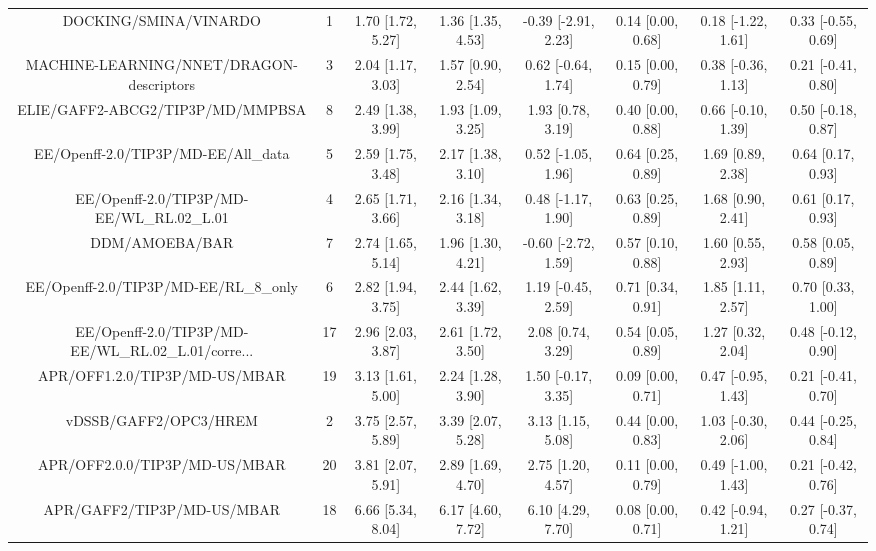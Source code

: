 \documentclass[8pt]{article}
\begin{document}
\begin{center}
\begin{footnotesize}
\begin{longtable}{|cccccccc|}
\bottomrule
\endlastfoot
                             DOCKING/SMINA/VINARDO &   1 & 1.70 [1.72, 5.27] & 1.36 [1.35, 4.53] & -0.39 [-2.91, 2.23] & 0.14 [0.00, 0.68] & 0.18 [-1.22, 1.61] & 0.33 [-0.55, 0.69] \\
          MACHINE-LEARNING/NNET/DRAGON-descriptors &   3 & 2.04 [1.17, 3.03] & 1.57 [0.90, 2.54] &  0.62 [-0.64, 1.74] & 0.15 [0.00, 0.79] & 0.38 [-0.36, 1.13] & 0.21 [-0.41, 0.80] \\
                  ELIE/GAFF2-ABCG2/TIP3P/MD/MMPBSA &   8 & 2.49 [1.38, 3.99] & 1.93 [1.09, 3.25] &   1.93 [0.78, 3.19] & 0.40 [0.00, 0.88] & 0.66 [-0.10, 1.39] & 0.50 [-0.18, 0.87] \\
               EE/Openff-2.0/TIP3P/MD-EE/All\_data &   5 & 2.59 [1.75, 3.48] & 2.17 [1.38, 3.10] &  0.52 [-1.05, 1.96] & 0.64 [0.25, 0.89] &  1.69 [0.89, 2.38] &  0.64 [0.17, 0.93] \\
         EE/Openff-2.0/TIP3P/MD-EE/WL\_RL.02\_L.01 &   4 & 2.65 [1.71, 3.66] & 2.16 [1.34, 3.18] &  0.48 [-1.17, 1.90] & 0.63 [0.25, 0.89] &  1.68 [0.90, 2.41] &  0.61 [0.17, 0.93] \\
                                    DDM/AMOEBA/BAR &   7 & 2.74 [1.65, 5.14] & 1.96 [1.30, 4.21] & -0.60 [-2.72, 1.59] & 0.57 [0.10, 0.88] &  1.60 [0.55, 2.93] &  0.58 [0.05, 0.89] \\
             EE/Openff-2.0/TIP3P/MD-EE/RL\_8\_only &   6 & 2.82 [1.94, 3.75] & 2.44 [1.62, 3.39] &  1.19 [-0.45, 2.59] & 0.71 [0.34, 0.91] &  1.85 [1.11, 2.57] &  0.70 [0.33, 1.00] \\
EE/Openff-2.0/TIP3P/MD-EE/WL\_RL.02\_L.01/corre... &  17 & 2.96 [2.03, 3.87] & 2.61 [1.72, 3.50] &   2.08 [0.74, 3.29] & 0.54 [0.05, 0.89] &  1.27 [0.32, 2.04] & 0.48 [-0.12, 0.90] \\
                     APR/OFF1.2.0/TIP3P/MD-US/MBAR &  19 & 3.13 [1.61, 5.00] & 2.24 [1.28, 3.90] &  1.50 [-0.17, 3.35] & 0.09 [0.00, 0.71] & 0.47 [-0.95, 1.43] & 0.21 [-0.41, 0.70] \\
                             vDSSB/GAFF2/OPC3/HREM &   2 & 3.75 [2.57, 5.89] & 3.39 [2.07, 5.28] &   3.13 [1.15, 5.08] & 0.44 [0.00, 0.83] & 1.03 [-0.30, 2.06] & 0.44 [-0.25, 0.84] \\
                     APR/OFF2.0.0/TIP3P/MD-US/MBAR &  20 & 3.81 [2.07, 5.91] & 2.89 [1.69, 4.70] &   2.75 [1.20, 4.57] & 0.11 [0.00, 0.79] & 0.49 [-1.00, 1.43] & 0.21 [-0.42, 0.76] \\
                        APR/GAFF2/TIP3P/MD-US/MBAR &  18 & 6.66 [5.34, 8.04] & 6.17 [4.60, 7.72] &   6.10 [4.29, 7.70] & 0.08 [0.00, 0.71] & 0.42 [-0.94, 1.21] & 0.27 [-0.37, 0.74] \\
\end{longtable}
\end{footnotesize}
\end{center}
\end{document}
